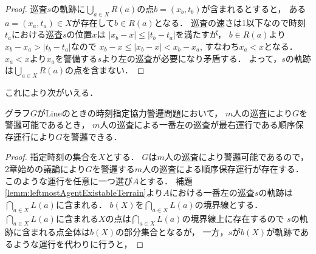 \begin{proof}
  巡査$s$の軌跡に$\bigcup_{a \in X} R(a)$の点$b = (x_b, t_b)$が含まれるとすると，
  ある$a = (x_a, t_a) \in X$が存在して$b \in R(a)$となる．
  巡査の速さは1以下なので時刻$t_a$における巡査$s$の位置$x$は
  $|x_b - x| \leq |t_b - t_a|$を満たすが，
  $b \in R(a)$より$x_b - x_a > |t_b - t_a|$なので
  $x_b - x \leq |x_b - x| < x_b - x_a$,
  すなわち$x_a < x$となる．
  $x_a < x$より$x_a$を警備する$s$より左の巡査が必要になり矛盾する．
  よって，$s$の軌跡は$\bigcup_{a \in X} R(a)$の点を含まない．
\end{proof}

これにより次がいえる．

\begin{lemm}
  \label{lemm:LineExactFinite}
  グラフ$G$がLineのときの時刻指定協力警邏問題において，
  $m$人の巡査により$G$を警邏可能であるとき，
  $m$人の巡査による一番左の巡査が最右運行である順序保存運行により$G$を警邏できる．
\end{lemm}

\begin{proof}
  指定時刻の集合を$X$とする．
  $G$は$m$人の巡査により警邏可能であるので，
  2章始めの議論により$G$を警邏する$m$人の巡査による順序保存運行が存在する．
  このような運行を任意に一つ選び$A$とする．
  補題\ref{lemm:leftmostAgentExistableTerrain}より$A$における一番左の巡査$s$の軌跡は
  $\bigcap_{a \in X} L(a)$に含まれる．
  $b(X)$を$\bigcap_{a \in X} L(a)$の境界線とする．
  $\bigcap_{a \in X} L(a)$に含まれる$X$の点は$\bigcap_{a \in X} L(a)$の境界線上に存在するので
  $s$の軌跡に含まれる点全体は$b(X)$の部分集合となるが，
  一方，$s$が$b(X)$が軌跡であるような運行を代わりに行うと，
\end{proof}


